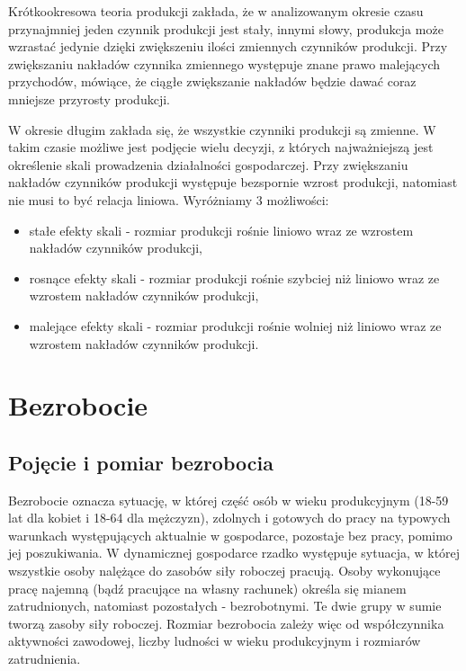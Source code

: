 \documentclass[12pt]{extarticle}
\begin{document}
Krótkookresowa teoria produkcji zakłada, że w analizowanym okresie czasu przynajmniej jeden czynnik produkcji jest stały, innymi słowy, produkcja może wzrastać jedynie dzięki zwiększeniu ilości zmiennych czynników produkcji. Przy zwiększaniu nakładów czynnika zmiennego występuje znane prawo malejących przychodów, mówiące, że ciągłe zwiększanie nakładów będzie dawać coraz mniejsze przyrosty produkcji.

W okresie długim zakłada się, że wszystkie czynniki produkcji są zmienne. W takim czasie możliwe jest podjęcie wielu decyzji, z których najważniejszą jest określenie skali prowadzenia działalności gospodarczej. Przy zwiększaniu nakładów czynników produkcji występuje bezspornie wzrost produkcji, natomiast nie musi to być relacja liniowa. Wyróżniamy 3 możliwości:

\begin{itemize}
	\item stałe efekty skali - rozmiar produkcji rośnie liniowo wraz ze wzrostem nakładów czynników produkcji,
	\item rosnące efekty skali - rozmiar produkcji rośnie szybciej niż liniowo wraz ze wzrostem nakładów czynników produkcji,
	\item malejące efekty skali - rozmiar produkcji rośnie wolniej niż liniowo wraz ze wzrostem nakładów czynników produkcji.
\end{itemize}

\section{Bezrobocie}

\subsection{Pojęcie i pomiar bezrobocia}

Bezrobocie oznacza sytuację, w której część osób w wieku produkcyjnym (18-59 lat dla kobiet i 18-64 dla mężczyzn), zdolnych i gotowych do pracy na typowych warunkach występujących aktualnie w gospodarce, pozostaje bez pracy, pomimo jej poszukiwania. W dynamicznej gospodarce rzadko występuje sytuacja, w której wszystkie osoby nalężące do zasobów siły roboczej pracują. Osoby wykonujące pracę najemną (bądź pracujące na własny rachunek) określa się mianem zatrudnionych, natomiast pozostałych - bezrobotnymi. Te dwie grupy w sumie tworzą zasoby siły roboczej. Rozmiar bezrobocia zależy więc od współczynnika aktywności zawodowej, liczby ludności w wieku produkcyjnym i rozmiarów zatrudnienia.
\end{document}
